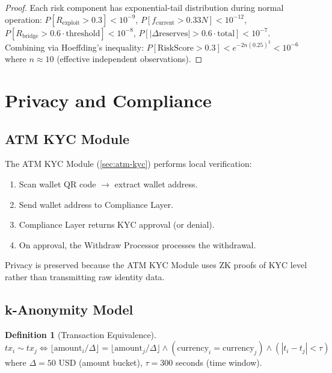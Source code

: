 \documentclass[12pt,a4paper]{article}
\theoremstyle{definition}
\newtheorem{definition}{Definition}[section]
\theoremstyle{remark}
\begin{document}
\begin{proof}
Each risk component has exponential-tail distribution during normal operation: $P[R_{\text{exploit}} > 0.3] < 10^{-9}$, $P[f_{\text{current}} > 0.33N] < 10^{-12}$, $P[R_{\text{bridge}} > 0.6 \cdot \text{threshold}] < 10^{-8}$, $P[|\Delta\text{reserves}| > 0.6 \cdot \text{total}] < 10^{-7}$. Combining via Hoeffding's inequality: $P[\text{RiskScore} > 0.3] < e^{-2n(0.25)^2} < 10^{-6}$ where $n \approx 10$ (effective independent observations).
\end{proof}


\section{Privacy and Compliance}
\label{sec:privacy-compliance}

\subsection{ATM KYC Module}

The ATM KYC Module (\cref{sec:atm-kyc}) performs local verification:
\begin{enumerate}[nosep]
    \item Scan wallet QR code $\to$ extract wallet address.
    \item Send wallet address to Compliance Layer.
    \item Compliance Layer returns KYC approval (or denial).
    \item On approval, the Withdraw Processor processes the withdrawal.
\end{enumerate}

Privacy is preserved because the ATM KYC Module uses ZK proofs of KYC level rather than transmitting raw identity data.

\subsection{k-Anonymity Model}

\begin{definition}[Transaction Equivalence]
\begin{equation}
tx_i \sim tx_j \iff \lfloor\text{amount}_i / \Delta\rfloor = \lfloor\text{amount}_j / \Delta\rfloor \wedge (\text{currency}_i = \text{currency}_j) \wedge (|t_i - t_j| < \tau)
\end{equation}
where $\Delta = 50$ USD (amount bucket), $\tau = 300$ seconds (time window).
\end{definition}
\end{document}
